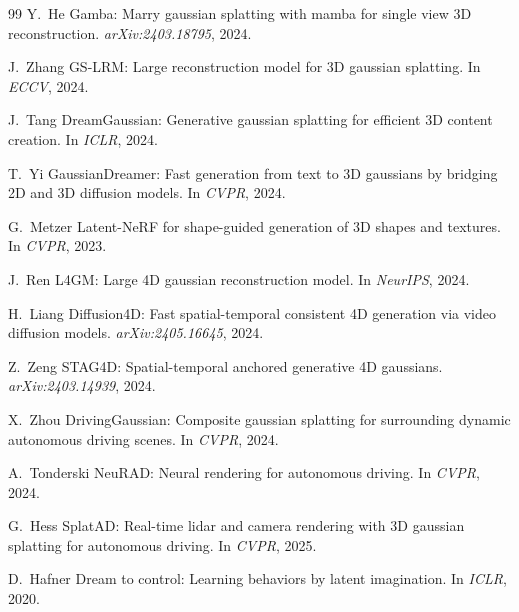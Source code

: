 \begin{thebibliography}{99}
Y.~He \etal
{Gamba}: Marry gaussian splatting with mamba for single view 3{D}
reconstruction.
\emph{arXiv:2403.18795}, 2024.


J.~Zhang \etal
{GS-LRM}: Large reconstruction model for 3{D} gaussian splatting.
In \emph{ECCV}, 2024.


J.~Tang \etal
{DreamGaussian}: Generative gaussian splatting for efficient 3{D} content
creation.
In \emph{ICLR}, 2024.


T.~Yi \etal
{GaussianDreamer}: Fast generation from text to 3{D} gaussians by bridging
2{D} and 3{D} diffusion models.
In \emph{CVPR}, 2024.


G.~Metzer \etal
Latent-{NeRF} for shape-guided generation of 3{D} shapes and textures.
In \emph{CVPR}, 2023.


J.~Ren \etal
{L4GM}: Large 4{D} gaussian reconstruction model.
In \emph{NeurIPS}, 2024.


H.~Liang \etal
Diffusion4{D}: Fast spatial-temporal consistent 4{D} generation via video
diffusion models.
\emph{arXiv:2405.16645}, 2024.


Z.~Zeng \etal
{STAG4D}: Spatial-temporal anchored generative 4{D} gaussians.
\emph{arXiv:2403.14939}, 2024.


X.~Zhou \etal
{DrivingGaussian}: Composite gaussian splatting for surrounding dynamic
autonomous driving scenes.
In \emph{CVPR}, 2024.


A.~Tonderski \etal
{NeuRAD}: Neural rendering for autonomous driving.
In \emph{CVPR}, 2024.


G.~Hess \etal
{SplatAD}: Real-time lidar and camera rendering with 3{D} gaussian splatting
for autonomous driving.
In \emph{CVPR}, 2025.


D.~Hafner \etal
{Dream} to control: Learning behaviors by latent imagination.
In \emph{ICLR}, 2020.



\end{thebibliography}
